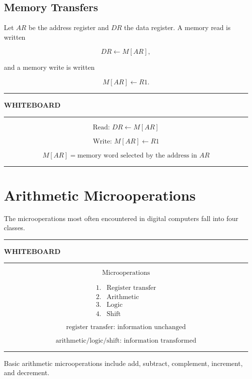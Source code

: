 \documentclass[11pt]{article}
\newenvironment{whiteboard}
{
    \par\medskip
    \hrule
    \vspace{0.35em}
    \noindent\textbf{\large WHITEBOARD}
    \par\vspace{0.3em}
    \hrule
    \vspace{0.65em}
}
{
    \vspace{0.45em}
    \hrule
    \par\medskip
}
\begin{document}
\subsection{Memory Transfers}

Let $AR$ be the address register and $DR$ the data register. A memory read is written

\[
DR\leftarrow M[AR],
\]

and a memory write is written

\[
M[AR]\leftarrow R1.
\]

\begin{whiteboard}

\[
\boxed{\text{Read: }DR\leftarrow M[AR]}
\]

\[
\boxed{\text{Write: }M[AR]\leftarrow R1}
\]

\[
M[AR]=\text{memory word selected by the address in }AR
\]

\end{whiteboard}

\section{Arithmetic Microoperations}

The microoperations most often encountered in digital computers fall into four classes.

\begin{whiteboard}

\[
\boxed{\text{Microoperations}}
\]

\[
\begin{array}{c|l}
1.&\text{Register transfer}\\
2.&\text{Arithmetic}\\
3.&\text{Logic}\\
4.&\text{Shift}
\end{array}
\]

\[
\boxed{\text{register transfer: information unchanged}}
\]

\[
\boxed{\text{arithmetic/logic/shift: information transformed}}
\]

\end{whiteboard}

Basic arithmetic microoperations include add, subtract, complement, increment, and decrement.
\end{document}
